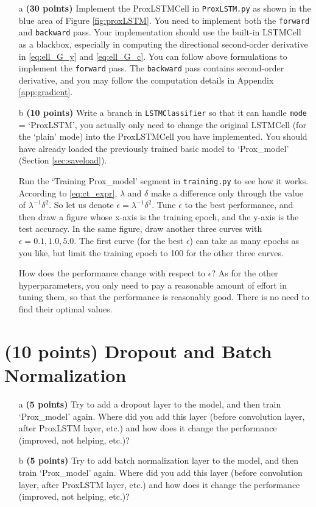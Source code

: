 \documentclass[11pt]{report}
\begin{document}
\begin{itemize}
    \item[a] \textbf{(30 points)} 
    Implement the ProxLSTMCell in \texttt{ProxLSTM.py} as shown in the blue area of Figure \ref{fig:proxLSTM}. 
    You need to implement both the \texttt{forward} and \texttt{backward} pass. Your implementation should use the built-in LSTMCell as a blackbox, 
    especially in computing the directional second-order derivative in \eqref{eq:ell_G_y} and \eqref{eq:ell_G_c}. 
    You can follow above formulations to implement the \texttt{forward} pass. 
    The \texttt{backward} pass contains second-order derivative, 
    and you may follow the computation details in Appendix \ref{app:gradient}.
    \item[b] \textbf{(10 points)} Write a branch in \texttt{LSTMClassifier} so that it can handle \texttt{mode} = `ProxLSTM', you actually only need to change the original LSTMCell (for the `plain' mode) into the ProxLSTMCell you have implemented. 
    You should have already loaded the previously trained basic model to `Prox\_model' (Section \ref{sec:saveload}).
    
    Run the `Training Prox\_model' segment in \texttt{training.py} to see how it works. 
    According to \eqref{eq:ct_expr},
    $\lambda$ and $\delta$ make a difference only through the value of $\lambda^{-1} \delta^2$.
    So let us denote $\epsilon = \lambda^{-1} \delta^2$. 
    Tune $\epsilon$ to the best performance, 
    and then draw a figure whose x-axis is the training epoch, 
    and the y-axis is the test accuracy. 
    In the same figure, draw another three curves with $\epsilon = {0.1, 1.0, 5.0}$.
    The first curve (for the best $\epsilon$) can take as many epochs as you like, 
    but limit the training epoch to 100 for the other three curves.
    
    How does the performance change with respect to $\epsilon$?
    As for the other hyperparameters,
    you only need to pay a reasonable amount of effort in tuning them, 
    so that the performance is reasonably good.
    There is no need to find their optimal values.
\end{itemize}


\section {(10 points) Dropout and Batch Normalization}
\begin{itemize}
    \item[a] \textbf{(5 points)} 
    Try to add a dropout layer to the model, 
    and then train `Prox\_model' again. 
    Where did you add this layer (before convolution layer, after ProxLSTM layer, etc.) and how does it change the performance (improved, not helping, etc.)?
    \item[b] \textbf{(5 points)} 
    Try to add batch normalization layer to the model, 
    and then train `Prox\_model' again. 
    Where did you add this layer (before convolution layer, after ProxLSTM layer, etc.) and how does it change the performance (improved, not helping, etc.)?
\end{itemize}
\end{document}
